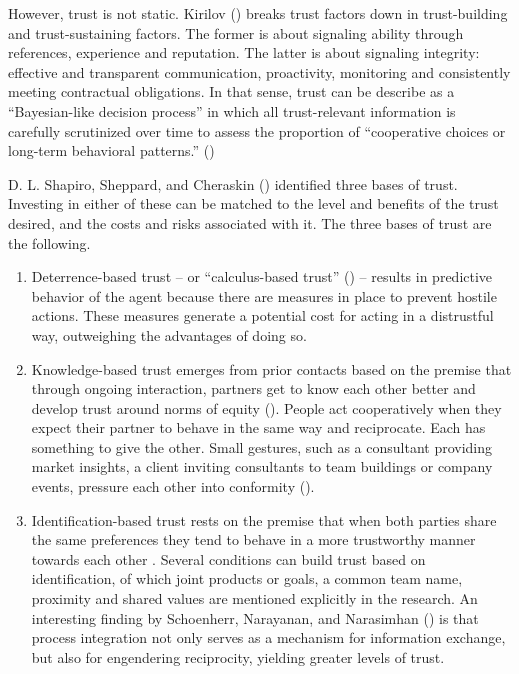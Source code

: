 \documentclass[
  man,floatsintext]{apa6}
\providecommand{\tightlist}{%
  \setlength{\itemsep}{0pt}\setlength{\parskip}{0pt}}
\begin{document}
However, trust is not static. Kirilov () breaks trust factors down in trust-building and trust-sustaining factors. The former is about signaling ability through references, experience and reputation. The latter is about signaling integrity: effective and transparent communication, proactivity, monitoring and consistently meeting contractual obligations. In that sense, trust can be describe as a ``Bayesian-like decision process'' in which all trust-relevant information is carefully scrutinized over time to assess the proportion of ``cooperative choices or long-term behavioral patterns.'' ()

D. L. Shapiro, Sheppard, and Cheraskin () identified three bases of trust. Investing in either of these can be matched to the level and benefits of the trust desired, and the costs and risks associated with it. The three bases of trust are the following.

\begin{enumerate}
\def\labelenumi{\arabic{enumi}.}
\tightlist
\item
  Deterrence-based trust -- or ``calculus-based trust'' () -- results in predictive behavior of the agent because there are measures in place to prevent hostile actions. These measures generate a potential cost for acting in a distrustful way, outweighing the advantages of doing so.
\item
  Knowledge-based trust emerges from prior contacts based on the premise that through ongoing interaction, partners get to know each other better and develop trust around norms of equity (). People act cooperatively when they expect their partner to behave in the same way and reciprocate. Each has something to give the other. Small gestures, such as a consultant providing market insights, a client inviting consultants to team buildings or company events, pressure each other into conformity ().
\item
  Identification-based trust rests on the premise that when both parties share the same preferences they tend to behave in a more trustworthy manner towards each other . Several conditions can build trust based on identification, of which joint products or goals, a common team name, proximity and shared values are mentioned explicitly in the research. An interesting finding by Schoenherr, Narayanan, and Narasimhan () is that process integration not only serves as a mechanism for information exchange, but also for engendering reciprocity, yielding greater levels of trust.
\end{enumerate}
\end{document}
